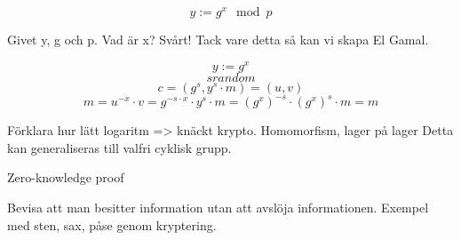\begin{frame}

$$
y := g^x \mod{p}
$$

Givet y, g och p. Vad är x? Svårt! Tack vare detta så kan vi skapa El Gamal.

$$ y := g^{x} $$
$$ s random $$
$$ c = (g^s, y^s\cdot m) = (u, v) $$
$$ m = u^{-x}\cdot v = g^{-s\cdot x}\cdot y^s\cdot m = (g^x)^{-s}\cdot(g^x)^s\cdot m = m $$

Förklara hur lätt logaritm => knäckt krypto. Homomorfism, lager på lager Detta kan generaliseras till valfri cyklisk grupp.


\end{frame}

\begin{frame}{Zero-knowledge proof}

Bevisa att man besitter information utan att avslöja informationen. Exempel med sten, sax, påse genom kryptering. 

\end{frame}